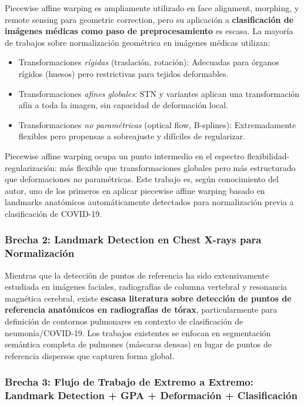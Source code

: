 Piecewise affine warping es ampliamente utilizado en face alignment, morphing, y remote sensing para geometric correction, pero su aplicación a \textbf{clasificación de imágenes médicas como paso de preprocesamiento} es escasa. La mayoría de trabajos sobre normalización geométrica en imágenes médicas utilizan:

\begin{itemize}
\item Transformaciones \textit{rígidas} (traslación, rotación): Adecuadas para órganos rígidos (huesos) pero restrictivas para tejidos deformables.
\item Transformaciones \textit{afines globales}: STN y variantes aplican una transformación afín a toda la imagen, sin capacidad de deformación local.
\item Transformaciones \textit{no paramétricas} (optical flow, B-splines): Extremadamente flexibles pero propensas a sobreajuste y difíciles de regularizar.
\end{itemize}

Piecewise affine warping ocupa un punto intermedio en el espectro flexibilidad-regularización: más flexible que transformaciones globales pero más estructurado que deformaciones no paramétricas. Este trabajo es, según conocimiento del autor, uno de los primeros en aplicar piecewise affine warping basado en landmarks anatómicos automáticamente detectados para normalización previa a clasificación de COVID-19.

\subsubsection{Brecha 2: Landmark Detection en Chest X-rays para Normalización}

Mientras que la detección de puntos de referencia ha sido extensivamente estudiada en imágenes faciales, radiografías de columna vertebral y resonancia magnética cerebral, existe \textbf{escasa literatura sobre detección de puntos de referencia anatómicos en radiografías de tórax}, particularmente para definición de contornos pulmonares en contexto de clasificación de neumonía/COVID-19. Los trabajos existentes se enfocan en segmentación semántica completa de pulmones (máscaras densas) en lugar de puntos de referencia dispersos que capturen forma global.

\subsubsection{Brecha 3: Flujo de Trabajo de Extremo a Extremo: Landmark Detection + GPA + Deformación + Clasificación}

